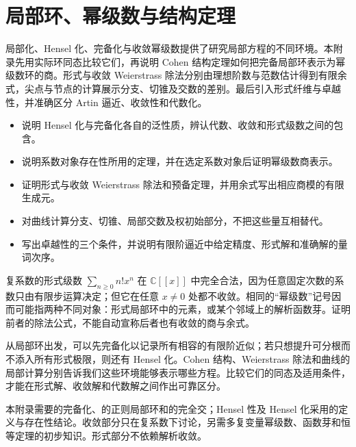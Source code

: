 
\chapter{局部环、幂级数与结构定理}
\label{b3:app:D}

\begin{chapterabstract}
	局部化、Hensel 化、完备化与收敛幂级数提供了研究局部方程的不同环境。本附录先用实际环同态比较它们，再说明 Cohen 结构定理如何把完备局部环表示为幂级数环的商。形式与收敛 Weierstrass 除法分别由理想阶数与范数估计得到有限余式，尖点与节点的计算展示分支、切锥及交数的差别。最后引入形式纤维与卓越性，并准确区分 Artin 逼近、收敛性和代数化。
\end{chapterabstract}

\begin{learninggoals}
	\begin{itemize}
		\item 说明 Hensel 化与完备化各自的泛性质，辨认代数、收敛和形式级数之间的包含。
		\item 说明系数对象存在性所用的定理，并在选定系数对象后证明幂级数商表示。
		\item 证明形式与收敛 Weierstrass 除法和预备定理，并用余式写出相应商模的有限生成元。
		\item 对曲线计算分支、切锥、局部交数及权初始部分，不把这些量互相替代。
		\item 写出卓越性的三个条件，并说明有限阶逼近中给定精度、形式解和准确解的量词次序。
	\end{itemize}
\end{learninggoals}

复系数的形式级数 \(\sum_{n\ge0}n!x^n\) 在 \(\mathbb C[[x]]\) 中完全合法，因为任意固定次数的系数只由有限步运算决定；但它在任意 \(x\ne0\) 处都不收敛。相同的“幂级数”记号因而可能指两种不同对象：形式局部环中的元素，或某个邻域上的解析函数芽。证明前者的除法公式，不能自动宣称后者也有收敛的商与余式。

\ProseParagraphBreak

从局部环出发，可以先完备化以记录所有相容的有限阶近似；若只想提升可分根而不添入所有形式极限，则还有 Hensel 化。Cohen 结构、Weierstrass 除法和曲线的局部计算分别告诉我们这些环境能够表示哪些方程。比较它们的同态及适用条件，才能在形式解、收敛解和代数解之间作出可靠区分。

\ProseParagraphBreak

本附录需要的完备化、的正则局部环和的完全交；Hensel 性及 Hensel 化采用的定义与存在性结论。收敛部分只在复系数下讨论，另需多复变量幂级数、函数芽和恒等定理的初步知识。形式部分不依赖解析收敛。

